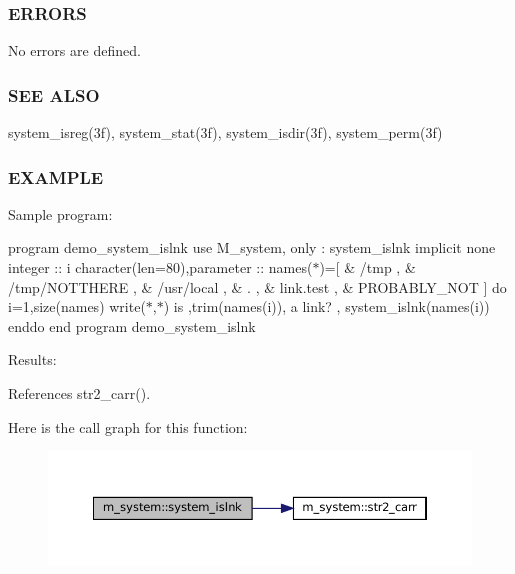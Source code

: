 \subsubsection*{E\+R\+R\+O\+RS}

No errors are defined.

\subsubsection*{S\+EE A\+L\+SO}

system\+\_\+isreg(3f), system\+\_\+stat(3f), system\+\_\+isdir(3f), system\+\_\+perm(3f)

\subsubsection*{E\+X\+A\+M\+P\+LE}

Sample program\+:

program demo\+\_\+system\+\_\+islnk use M\+\_\+system, only \+: system\+\_\+islnk implicit none integer \+:\+: i character(len=80),parameter \+:\+: names($\ast$)=\mbox{[} \& \textquotesingle{}/tmp \textquotesingle{}, \& \textquotesingle{}/tmp/\+N\+O\+T\+T\+H\+E\+RE \textquotesingle{}, \& \textquotesingle{}/usr/local \textquotesingle{}, \& \textquotesingle{}. \textquotesingle{}, \& \textquotesingle{}link.\+test \textquotesingle{}, \& \textquotesingle{}P\+R\+O\+B\+A\+B\+L\+Y\+\_\+\+N\+OT \textquotesingle{}\mbox{]} do i=1,size(names) write($\ast$,$\ast$)\textquotesingle{} is \textquotesingle{},trim(names(i)),\textquotesingle{} a link? \textquotesingle{}, system\+\_\+islnk(names(i)) enddo end program demo\+\_\+system\+\_\+islnk

Results\+: 

References str2\+\_\+carr().

Here is the call graph for this function\+:\nopagebreak
\begin{figure}[H]
\begin{center}
\leavevmode
\includegraphics[width=350pt]{namespacem__system_a268d0cd27be36527894fe2cae0f1b9f6_cgraph}
\end{center}
\end{figure}
\mbox{\label{namespacem__system_a8ea0d0430227af61b8083b4e7d6e597d}} 
